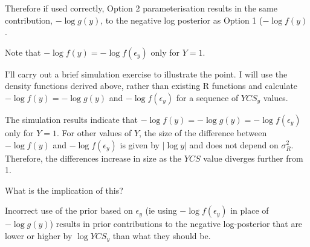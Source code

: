 \begin{appendices}
Therefore if used correctly, Option 2 parameterisation results in the
same contribution, \(-\log g(y)\), to the negative log posterior as
Option 1 (\(-\log f(y)\).

Note that \(-\log f(y)=-\log f(\epsilon_y)\) only for \(Y=1\).

I'll carry out a brief simulation exercise to illustrate the point. I
will use the density functions derived above, rather than existing R
functions and calculate \(-\log f(y) = -\log g(y)\) and
\(-\log f(\epsilon_y)\) for a sequence of \(YCS_y\) values.

The simulation results indicate that
\(-\log f(y) = -\log g(y) =-\log f(\epsilon_y)\) only for \(Y=1\). For
other values of \(Y\), the size of the difference between \(-\log f(y)\)
and \(-\log f(\epsilon_y)\) is given by \(\vert \log y\vert\) and does
not depend on \(\sigma^2_R\). Therefore, the differences increase in
size as the \(YCS\) value diverges further from 1.

What is the implication of this?

Incorrect use of the prior based on \(\epsilon_y\) (ie using
\(-\log f(\epsilon_y)\) in place of \(-\log g(y)\)) results in prior
contributions to the negative log-posterior that are lower or higher by
\(\log YCS_y\) than what they should be.
\end{appendices}